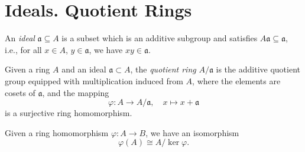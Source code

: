 


\section{Ideals. Quotient Rings}

\begin{definition}[Ideal]
    An \emph{ideal} \( \mathfrak{a} \subseteq A \) is a subset which is an additive subgroup and satisfies \( A\mathfrak{a} \subseteq \mathfrak{a} \), i.e., for all \( x \in A \), \( y \in \mathfrak{a} \), we have \( xy \in \mathfrak{a} \).
    \end{definition}
    
    \begin{definition}
    Given a ring \( A \) and an ideal \( \mathfrak{a} \subset A \), the \emph{quotient ring} \( A/\mathfrak{a} \) is the additive quotient group equipped with multiplication induced from \( A \), where the elements are cosets of \( \mathfrak{a} \), and the mapping
    \[
    \varphi: A \to A/\mathfrak{a}, \quad x \mapsto x + \mathfrak{a}
    \]
    is a surjective ring homomorphism.
    \end{definition}
    
    \begin{theorem}
        Given a ring homomorphism \( \varphi: A \to B \), we have an isomorphism
        \[
        \varphi(A) \cong A / \ker \varphi.
        \]
    \end{theorem}
    
